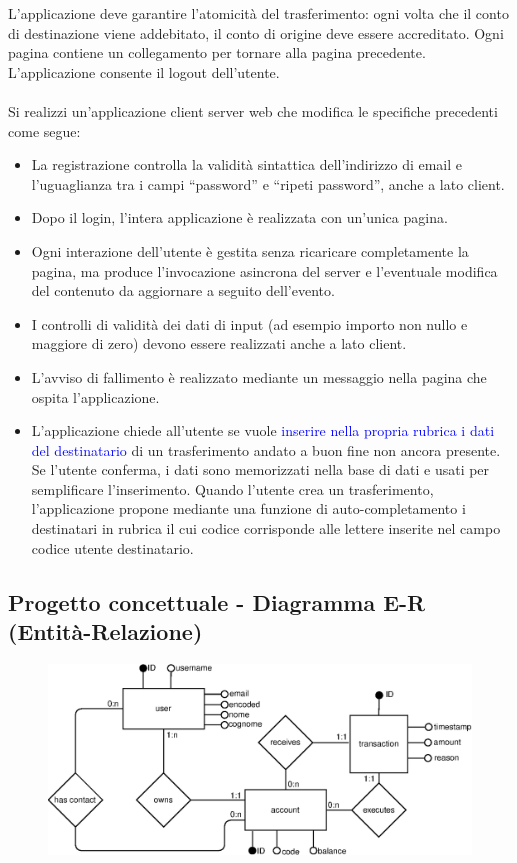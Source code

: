 \documentclass{article}
\begin{document}
L’applicazione deve garantire l’atomicità del trasferimento: ogni volta che il conto di
destinazione viene addebitato, il conto di origine deve essere accreditato. Ogni pagina
contiene un collegamento per tornare alla pagina precedente. L’applicazione consente il
logout dell’utente.
\\
\\
Si realizzi un’applicazione client server web che modifica le specifiche precedenti come segue:
\begin{itemize}
\item La registrazione controlla la validità sintattica dell’indirizzo di email e l’uguaglianza tra
i campi “password” e “ripeti password”, anche a lato client.
\item Dopo il login, l’intera applicazione è realizzata con un’unica pagina.
\item 	Ogni interazione dell’utente è gestita senza ricaricare completamente la pagina, ma
produce l’invocazione asincrona del server e l’eventuale modifica del contenuto da
aggiornare a seguito dell’evento.
\item I controlli di validità dei dati di input (ad esempio importo non nullo e maggiore di zero)
devono essere realizzati anche a lato client.
\item L’avviso di fallimento è realizzato mediante un messaggio nella pagina che ospita
l’applicazione.
\item L’applicazione chiede all’utente se vuole  \textcolor{blue}{inserire nella propria rubrica i dati del
destinatario} di un trasferimento andato a buon fine non ancora presente. Se l’utente
conferma, i dati sono memorizzati nella base di dati e usati per semplificare
l’inserimento. Quando l’utente crea un trasferimento, l’applicazione propone mediante
una funzione di auto-completamento i destinatari in rubrica il cui codice corrisponde
alle lettere inserite nel campo codice utente destinatario.
\end{itemize}

\subsection{Progetto concettuale - Diagramma E-R (Entità-Relazione)}
\begin{figure}[H]
\centering
\includegraphics[width=1\textwidth]{assets/diagram.eps}
\end{figure}
\end{document}
